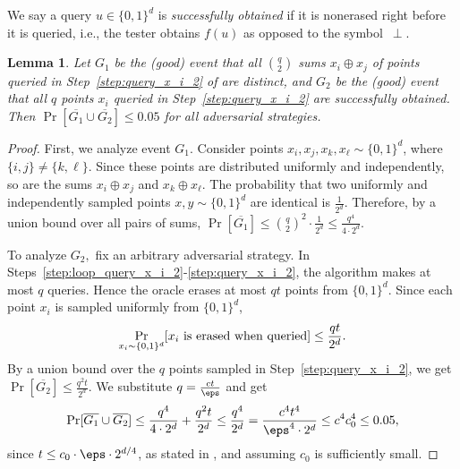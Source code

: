 \documentclass[11pt]{article}
\numberwithin{equation}{section}
\newtheorem{lemma}[theorem]{Lemma}
\theoremstyle{definition}
\theoremstyle{plain}
\begin{document}
We say a query $u \in \{0,1\}^d$ is {\em successfully obtained} if it is nonerased right before it is queried, i.e., the tester obtains $f(u)$ as opposed to the symbol~$\perp$.

\begin{lemma}\label{lem:distinct-and-nonerased}
%
Let $G_1$ be the (good) event that all $\binom{q}{2}$ sums $x_i \oplus x_j$ of points queried in Step~\ref{step:query_x_i_2} of  are distinct, and $G_2$ be the (good) event that all $q$ points $x_i$ queried in Step~\ref{step:query_x_i_2} are successfully obtained. Then $\Pr[\overline{G_1} \cup \overline{G_2}] \le 0.05$ for all adversarial strategies.
\end{lemma}
\begin{proof}
First, we analyze event $G_1$. Consider points $x_i, x_j, x_k, x_\ell \sim \{0,1\}^d$,  where $\{i,j\} \neq \{k, \ell\}$.  Since these points are distributed uniformly and independently, so are the sums $x_i \oplus x_j$ and $x_k \oplus x_\ell$. The probability that two uniformly and independently sampled points $x,y \sim \{0,1\}^d$ are identical is  $\frac{1}{2^d}$. Therefore, by a union bound over all pairs of sums, $\Pr[\overline{G_1}] \leq \binom{q}{2}^2 \cdot \frac{1}{2^d} \leq \frac{q^4}{4\cdot 2^d}.$ 

To analyze $G_2,$ fix an arbitrary adversarial strategy.
In Steps~\ref{step:loop_query_x_i_2}-\ref{step:query_x_i_2}, the algorithm makes at most $q$ queries. Hence the oracle erases at most $qt$ points from $\{0,1\}^d$. Since each point $x_i$ is sampled uniformly from $\{0,1\}^d$,
\begin{equation*}
    \Pr_{x_i \sim \{0,1\}^d} [x_i \textnormal{ is erased when queried}] \leq \frac{qt}{ 2^d}.
\end{equation*}
By a union bound over the $q$ points sampled in Step~\ref{step:query_x_i_2}, we get $\Pr[\overline{G_2}] \leq \frac{q^2t}{2^d}$. We substitute $q = \frac{ct}{\eps}$ and get
\begin{align*}
     \Pr[\overline{G_1} \cup \overline{G_2}] \leq \frac{q^4}{4 \cdot 2^d} + \frac{q^2t}{2^d} \leq \frac{q^4}{2^d} = \frac{c^4 t^4}{\eps^4 \cdot 2^d} \leq  c^4c_0^4 \leq 0.05,
\end{align*}
since $t \leq c_0\cdot\eps \cdot  2^{d/4}$, as stated in , and assuming $c_0$ is sufficiently small.
\end{proof}
\end{document}
